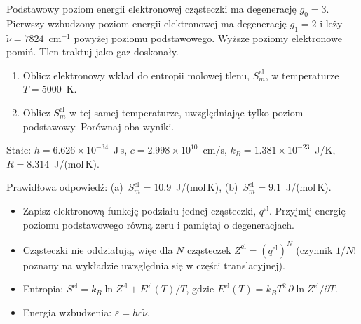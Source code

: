 
Podstawowy poziom energii elektronowej cząsteczki  ma degenerację
$g_0 = 3$. Pierwszy wzbudzony poziom energii elektronowej ma degenerację
$g_1 = 2$ i leży $\tilde\nu = 7824$~cm$^{-1}$ powyżej poziomu podstawowego.
Wyższe poziomy elektronowe pomiń. Tlen traktuj jako gaz doskonały.

\begin{enumerate}[label=(\alph*)]
  \item Oblicz elektronowy wkład do entropii molowej tlenu, $S^\text{el}_m$,
    w temperaturze $T = 5000$~K.
  \item Oblicz $S^\text{el}_m$ w tej samej temperaturze, uwzględniając tylko
    poziom podstawowy. Porównaj oba wyniki.
\end{enumerate}

{\raggedright
Stałe: \mbox{$h = 6.626\times 10^{-34}$~J\,s},
\mbox{$c = 2.998\times 10^{10}$~cm/s},
\mbox{$k_B = 1.381\times 10^{-23}$~J/K},
\mbox{$R = 8.314$~J/(mol\,K)}.

Prawidłowa odpowiedź: (a)~$S^\text{el}_m = 10.9$~J/(mol\,K),
(b)~$S^\text{el}_m = 9.1$~J/(mol\,K).\par}

\begin{wskazowki}
\begin{itemize}
  \item Zapisz elektronową funkcję podziału jednej cząsteczki, $q^\text{el}$.
    Przyjmij energię poziomu podstawowego równą zeru i pamiętaj
    o degeneracjach.
  \item Cząsteczki nie oddziałują, więc dla $N$ cząsteczek
    $Z^\text{el} = (q^\text{el})^N$ (czynnik $1/N!$ poznany na wykładzie
    uwzględnia się w części translacyjnej).
  \item Entropia: $S^\text{el} = k_B\ln Z^\text{el} + E^\text{el}(T)/T$, gdzie
    $E^\text{el}(T) = k_BT^2\,\partial\ln Z^\text{el}/\partial T$.
  \item Energia wzbudzenia: $\varepsilon = hc\tilde\nu$.
\end{itemize}
\end{wskazowki}
